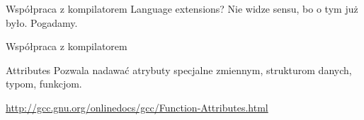 \begin{frame}[fragile]{Współpraca z kompilatorem}
	Language extensions? Nie widze sensu, bo o tym już było. Pogadamy.
\end{frame}
\begin{frame}[fragile]{Współpraca z kompilatorem}
	\begin{block}{Attributes}
		Pozwala nadawać atrybuty specjalne zmiennym, strukturom danych, typom, funkcjom.
		\begin{itemize}
			\item \verb*%int x __attribute__((aligned(16)))=0;% //zmienna
			\item \verb*%int x[2] __attribute__ ((packed));% //jako czesc struktury %
			\item \verb*%typedef int more_aligned_int %
			\verb*%__attribute__ ((aligned (8)));% //typ %
			\item \verb*%int old_fn () __attribute__ ((fastcall));% //funkcja
			\item \verb*%void fatal () __attribute__ ((noreturn));%
		\end{itemize}
		\url{http://gcc.gnu.org/onlinedocs/gcc/Function-Attributes.html}
	\end{block}
\end{frame}
